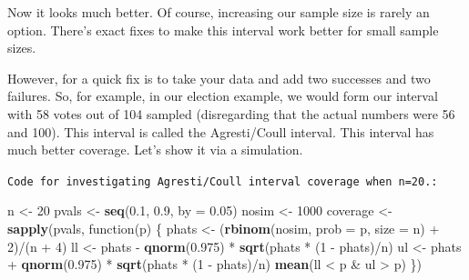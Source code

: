 \documentclass[]{article}
\newenvironment{Shaded}{\begin{snugshade}}{\end{snugshade}}
\newcommand{\KeywordTok}[1]{\textcolor[rgb]{0.13,0.29,0.53}{\textbf{{#1}}}}
\newcommand{\DataTypeTok}[1]{\textcolor[rgb]{0.13,0.29,0.53}{{#1}}}
\newcommand{\DecValTok}[1]{\textcolor[rgb]{0.00,0.00,0.81}{{#1}}}
\newcommand{\FloatTok}[1]{\textcolor[rgb]{0.00,0.00,0.81}{{#1}}}
\newcommand{\StringTok}[1]{\textcolor[rgb]{0.31,0.60,0.02}{{#1}}}
\newcommand{\NormalTok}[1]{{#1}}
\begin{document}
Now it looks much better. Of course, increasing our sample size is
rarely an option. There's exact fixes to make this interval work better
for small sample sizes.

However, for a quick fix is to take your data and add two successes and
two failures. So, for example, in our election example, we would form
our interval with 58 votes out of 104 sampled (disregarding that the
actual numbers were 56 and 100). This interval is called the
Agresti/Coull interval. This interval has much better coverage. Let's
show it via a simulation.

\vspace{1pc}

\verb;Code for investigating Agresti/Coull interval coverage when n=20.:;

\begin{Shaded}
\begin{Highlighting}[]
\NormalTok{n <-}\StringTok{ }\DecValTok{20}
\NormalTok{pvals <-}\StringTok{ }\KeywordTok{seq}\NormalTok{(}\FloatTok{0.1}\NormalTok{, }\FloatTok{0.9}\NormalTok{, }\DataTypeTok{by =} \FloatTok{0.05}\NormalTok{)}
\NormalTok{nosim <-}\StringTok{ }\DecValTok{1000}
\NormalTok{coverage <-}\StringTok{ }\KeywordTok{sapply}\NormalTok{(pvals, function(p) \{}
    \NormalTok{phats <-}\StringTok{ }\NormalTok{(}\KeywordTok{rbinom}\NormalTok{(nosim, }\DataTypeTok{prob =} \NormalTok{p, }\DataTypeTok{size =} \NormalTok{n) +}\StringTok{ }\DecValTok{2}\NormalTok{)/(n +}\StringTok{ }\DecValTok{4}\NormalTok{)}
    \NormalTok{ll <-}\StringTok{ }\NormalTok{phats -}\StringTok{ }\KeywordTok{qnorm}\NormalTok{(}\FloatTok{0.975}\NormalTok{) *}\StringTok{ }\KeywordTok{sqrt}\NormalTok{(phats *}\StringTok{ }\NormalTok{(}\DecValTok{1} \NormalTok{-}\StringTok{ }\NormalTok{phats)/n)}
    \NormalTok{ul <-}\StringTok{ }\NormalTok{phats +}\StringTok{ }\KeywordTok{qnorm}\NormalTok{(}\FloatTok{0.975}\NormalTok{) *}\StringTok{ }\KeywordTok{sqrt}\NormalTok{(phats *}\StringTok{ }\NormalTok{(}\DecValTok{1} \NormalTok{-}\StringTok{ }\NormalTok{phats)/n)}
    \KeywordTok{mean}\NormalTok{(ll <}\StringTok{ }\NormalTok{p &}\StringTok{ }\NormalTok{ul >}\StringTok{ }\NormalTok{p)}
\NormalTok{\})}
\end{Highlighting}
\end{Shaded}
\end{document}
